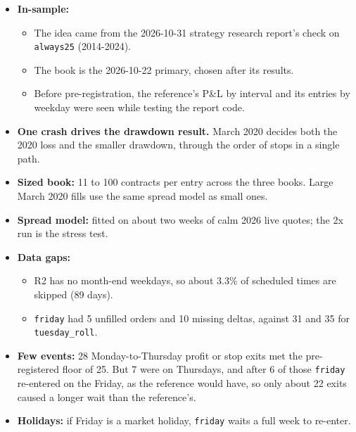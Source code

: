 \documentclass{article}
\begin{document}
\begin{itemize}

\item \textbf{In-sample:}

\begin{itemize}

\item The idea came from the 2026-10-31 strategy research report's check on \texttt{always25} (2014-2024).

\item The book is the 2026-10-22 primary, chosen after its results.

\item Before pre-registration, the reference's P\&L by interval and its entries by weekday were seen while testing the report code.

\end{itemize}

\item \textbf{One crash drives the drawdown result.} March 2020 decides both the 2020 loss and the smaller drawdown, through the order of stops in a single path.

\item \textbf{Sized book:} 11 to 100 contracts per entry across the three books. Large March 2020 fills use the same spread model as small ones.

\item \textbf{Spread model:} fitted on about two weeks of calm 2026 live quotes; the 2x run is the stress test.

\item \textbf{Data gaps:}

\begin{itemize}

\item R2 has no month-end weekdays, so about 3.3\% of scheduled times are skipped (89 days).

\item \texttt{friday} had 5 unfilled orders and 10 missing deltas, against 31 and 35 for \texttt{tuesday\_\allowbreak{}roll}.

\end{itemize}

\item \textbf{Few events:} 28 Monday-to-Thursday profit or stop exits met the pre-registered floor of 25. But 7 were on Thursdays, and after 6 of those \texttt{friday} re-entered on the Friday, as the reference would have, so only about 22 exits caused a longer wait than the reference's.

\item \textbf{Holidays:} if Friday is a market holiday, \texttt{friday} waits a full week to re-enter.

\end{itemize}
\end{document}
